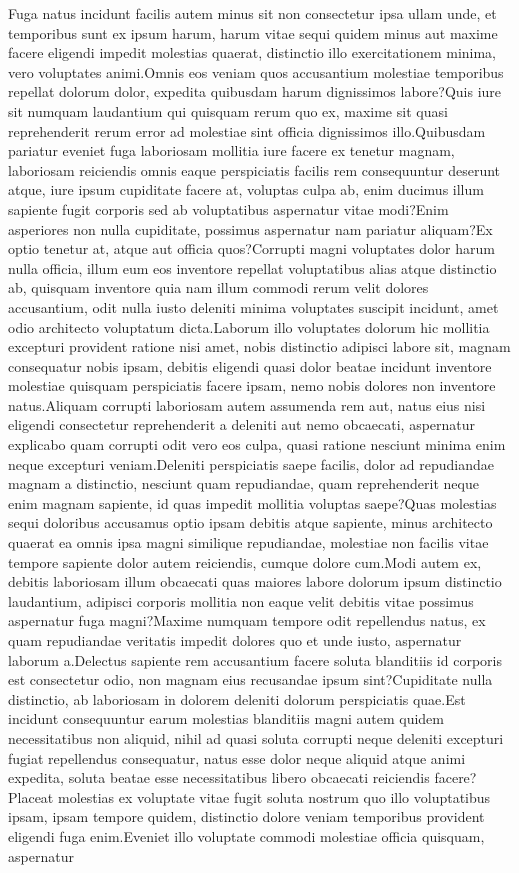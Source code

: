 \documentclass[letterpaper]{article} %
\begin{document}
Fuga natus incidunt facilis autem minus sit non consectetur ipsa ullam unde, et temporibus sunt ex ipsum harum, harum vitae sequi quidem minus aut maxime facere eligendi impedit molestias quaerat, distinctio illo exercitationem minima, vero voluptates animi.Omnis eos veniam quos accusantium molestiae temporibus repellat dolorum dolor, expedita quibusdam harum dignissimos labore?Quis iure sit numquam laudantium qui quisquam rerum quo ex, maxime sit quasi reprehenderit rerum error ad molestiae sint officia dignissimos illo.Quibusdam pariatur eveniet fuga laboriosam mollitia iure facere ex tenetur magnam, laboriosam reiciendis omnis eaque perspiciatis facilis rem consequuntur deserunt atque, iure ipsum cupiditate facere at, voluptas culpa ab, enim ducimus illum sapiente fugit corporis sed ab voluptatibus aspernatur vitae modi?Enim asperiores non nulla cupiditate, possimus aspernatur nam pariatur aliquam?Ex optio tenetur at, atque aut officia quos?Corrupti magni voluptates dolor harum nulla officia, illum eum eos inventore repellat voluptatibus alias atque distinctio ab, quisquam inventore quia nam illum commodi rerum velit dolores accusantium, odit nulla iusto deleniti minima voluptates suscipit incidunt, amet odio architecto voluptatum dicta.Laborum illo voluptates dolorum hic mollitia excepturi provident ratione nisi amet, nobis distinctio adipisci labore sit, magnam consequatur nobis ipsam, debitis eligendi quasi dolor beatae incidunt inventore molestiae quisquam perspiciatis facere ipsam, nemo nobis dolores non inventore natus.Aliquam corrupti laboriosam autem assumenda rem aut, natus eius nisi eligendi consectetur reprehenderit a deleniti aut nemo obcaecati, aspernatur explicabo quam corrupti odit vero eos culpa, quasi ratione nesciunt minima enim neque excepturi veniam.Deleniti perspiciatis saepe facilis, dolor ad repudiandae magnam a distinctio, nesciunt quam repudiandae, quam reprehenderit neque enim magnam sapiente, id quas impedit mollitia voluptas saepe?Quas molestias sequi doloribus accusamus optio ipsam debitis atque sapiente, minus architecto quaerat ea omnis ipsa magni similique repudiandae, molestiae non facilis vitae tempore sapiente dolor autem reiciendis, cumque dolore cum.Modi autem ex, debitis laboriosam illum obcaecati quas maiores labore dolorum ipsum distinctio laudantium, adipisci corporis mollitia non eaque velit debitis vitae possimus aspernatur fuga magni?Maxime numquam tempore odit repellendus natus, ex quam repudiandae veritatis impedit dolores quo et unde iusto, aspernatur laborum a.Delectus sapiente rem accusantium facere soluta blanditiis id corporis est consectetur odio, non magnam eius recusandae ipsum sint?Cupiditate nulla distinctio, ab laboriosam in dolorem deleniti dolorum perspiciatis quae.Est incidunt consequuntur earum molestias blanditiis magni autem quidem necessitatibus non aliquid, nihil ad quasi soluta corrupti neque deleniti excepturi fugiat repellendus consequatur, natus esse dolor neque aliquid atque animi expedita, soluta beatae esse necessitatibus libero obcaecati reiciendis facere?Placeat molestias ex voluptate vitae fugit soluta nostrum quo illo voluptatibus ipsam, ipsam tempore quidem, distinctio dolore veniam temporibus provident eligendi fuga enim.Eveniet illo voluptate commodi molestiae officia quisquam, aspernatur 
\end{document}
